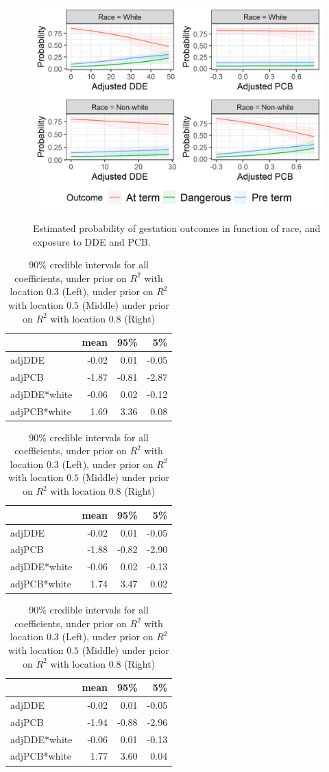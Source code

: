 \documentclass[10pt]{jmlr}%
\begin{document}
\begin{figure}[htbp]
	\centering
	\caption{Estimated probability of gestation outcomes in function of race, and exposure to DDE and PCB.}
	\includegraphics[width=0.7\linewidth]{results}
	\label{fig:results}
\end{figure}


\begin{table}
	\footnotesize
	\begin{tabular}{lrrr}
		\toprule
		  & mean & 95\% & 5\%\\
		\midrule
		adjDDE & -0.02 & 0.01 & -0.05\\
		adjPCB & -1.87 & -0.81 & -2.87\\
		adjDDE*white & -0.06 & 0.02 & -0.12\\
		adjPCB*white & 1.69 & 3.36 & 0.08\\
		\bottomrule
	\end{tabular}
	\hfill
	\begin{tabular}{lrrr}
		\toprule
		  & mean & 95\% & 5\%\\
		\midrule
		adjDDE & -0.02 & 0.01 & -0.05\\
		adjPCB & -1.88 & -0.82 & -2.90\\
		adjDDE*white & -0.06 & 0.02 & -0.13\\
		adjPCB*white & 1.74 & 3.47 & 0.02\\
		\bottomrule
	\end{tabular}
	\hfill
	\begin{tabular}{lrrr}
		\toprule
		  & mean & 95\% & 5\%\\
		\midrule
		adjDDE & -0.02 & 0.01 & -0.05\\
		adjPCB & -1.94 & -0.88 & -2.96\\
		adjDDE*white & -0.06 & 0.01 & -0.13\\
		adjPCB*white & 1.77 & 3.60 & 0.04\\
		\bottomrule
	\end{tabular}
	\label{tab:priors} 
	\caption{90\% credible intervals for all coefficients, under prior on $R^2$ with location $0.3$ (Left),  under prior on $R^2$ with location $0.5$ (Middle) under prior on $R^2$ with location $0.8$ (Right)}
\end{table}
\end{document}
